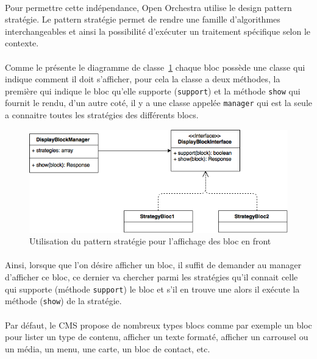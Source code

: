 	       \paragraph{}
	       Pour permettre cette indépendance, Open Orchestra utilise le design pattern stratégie. Le pattern stratégie permet de rendre une famille d'algorithmes interchangeables et ainsi  la possibilité d'exécuter un traitement spécifique selon le contexte.

          \paragraph{}
	       Comme le présente le diagramme de classe~\ref{pattern strategy} chaque bloc possède une classe qui indique comment il doit s'afficher, pour cela la classe a deux méthodes, la première qui indique le bloc qu'elle supporte (\verb?support?) et la méthode \verb?show? qui fournit le rendu, d'un autre coté, il y a une classe appelée \verb?manager?  qui est la seule a connaitre toutes les stratégies des différents blocs. 
		\begin{figure}[H]
        \begin{center}
          \includegraphics[scale=0.75]{images/strategy_block}
        \end{center}
        \caption{Utilisation du pattern stratégie pour l'affichage des bloc en front}
        \label{pattern strategy}
      \end{figure}
         \paragraph{}
	       Ainsi, lorsque que l'on désire afficher un bloc, il suffit de demander au manager d'afficher ce bloc, ce dernier va chercher parmi les stratégies qu'il connait celle qui supporte (méthode \verb?support?) le bloc et s'il en trouve une alors il exécute la méthode (\verb?show?) de la stratégie.
	        
	      	\paragraph{}
	      	Par défaut, le CMS propose de nombreux types blocs  comme par exemple un bloc pour lister un type de contenu, afficher un texte formaté, afficher un carrousel ou un média, un menu, une carte, un bloc de contact, etc.
